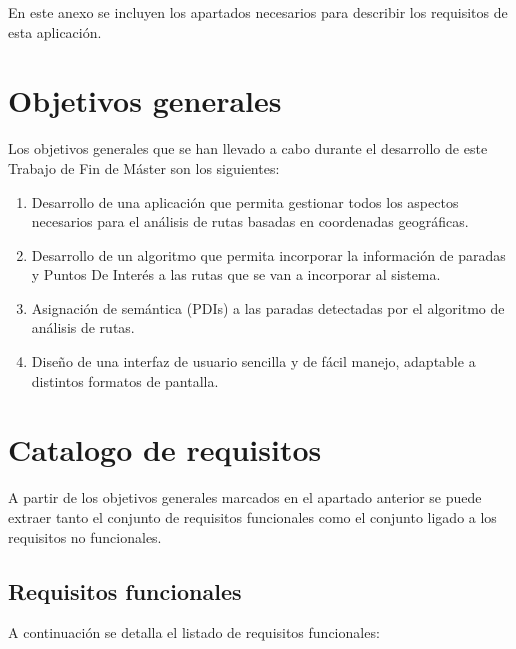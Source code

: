 En este anexo se incluyen los apartados necesarios para describir los requisitos de esta aplicación.

\section{Objetivos generales}

Los objetivos generales que se han llevado a cabo durante el desarrollo de este Trabajo de Fin de Máster son los siguientes:

\begin{enumerate}
	\item Desarrollo de una aplicación que permita gestionar todos los aspectos necesarios para el análisis de rutas basadas en coordenadas geográficas.
	\item Desarrollo de un algoritmo que permita incorporar la información de paradas y Puntos De Interés a las rutas que se van a incorporar al sistema.
	\item Asignación de semántica (PDIs) a las paradas detectadas por el algoritmo de análisis de rutas.
	\item Diseño de una interfaz de usuario sencilla y de fácil manejo, adaptable a distintos formatos de pantalla.
\end{enumerate}

\section{Catalogo de requisitos}
A partir de los objetivos generales marcados en el apartado anterior se puede extraer tanto el conjunto de requisitos funcionales como el conjunto ligado a los requisitos no funcionales.

\subsection{Requisitos funcionales}
A continuación se detalla el listado de requisitos funcionales:

